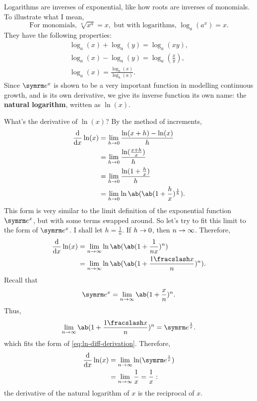Logarithms are inverses of exponential, like how roots are inverses of monomials. To illustrate what I mean,
\begin{equation*}
	\textrm{For monomials, } \sqrt[a]{x^a} = x, \textrm{ but with logarithms, } \log_{a}(a^x) = x.
\end{equation*}
They have the following properties:
\begin{gather}
    \log_a(x) + \log_a(y) = \log_a(xy), \\
    \log_a(x) - \log_a(y) = \log_a\left(\frac{x}{y}\right), \\
    \log_a(x) = \frac{\log_b(x)}{\log_b(a)}.
\end{gather}
Since $\e^x$ is shown to be a very important function in modelling continuous growth, and is its own derivative, we give its inverse function its own name: the \textbf{natural logarithm}, written as $\ln(x)$.

What's the derivative of $\ln(x)$? By the method of increments,
\begin{align}
	\odv*{\ln(x)}{x} &= \lim_{h \appr 0}\frac{\ln(x + h) - \ln(x)}{h} \\
					&= \lim_{h \appr 0}\frac{\ln(\frac{x + h}{x})}{h} \\
					&= \lim_{h \appr 0}\frac{\ln(1 + \frac{h}{x})}{h} \\
					&= \lim_{h \appr 0}\ln\ab(\ab(1 + \frac{h}{x})^{\frac{1}{h}}).
\end{align}
This form is very similar to the limit definition of the exponential function $\e^x$, but with some terms swapped around. So let's try to fit this limit to the form of $\e^x$. I shall let $h = \frac{1}{n}$. If $h \rightarrow 0$, then $n \rightarrow \infty$. Therefore,
\begin{align}
	\odv*{\ln(x)}{x} &= \lim_{n \appr \infty}\ln\ab(\ab(1 + \frac{1}{nx})^{n}) \\
					 &= \lim_{n \appr \infty}\ln\ab(\ab(1 + \frac{\flatfrac{1}{x}}{n})^n). \label{eq:ln-diff-derivation}
\end{align}
Recall that
\begin{equation}
	\e^x = \lim_{n \appr \infty}\ab(1 + \frac{x}{n})^n.
\end{equation}
Thus,
\begin{equation}
	\lim_{n \appr \infty}\ab(1 + \frac{\flatfrac{1}{x}}{n})^n = \e^{\frac{1}{x}}.
\end{equation}
which fits the form of \cref{eq:ln-diff-derivation}. Therefore,
\begin{align}
	\odv*{\ln(x)}{x} &= \lim_{n \appr \infty}\ln(\e^{\frac{1}{x}}) \\
					 &= \lim_{n \appr \infty}\frac{1}{x} = \frac{1}{x}:
\end{align}
the derivative of the natural logarithm of $x$ is the reciprocal of $x$.

